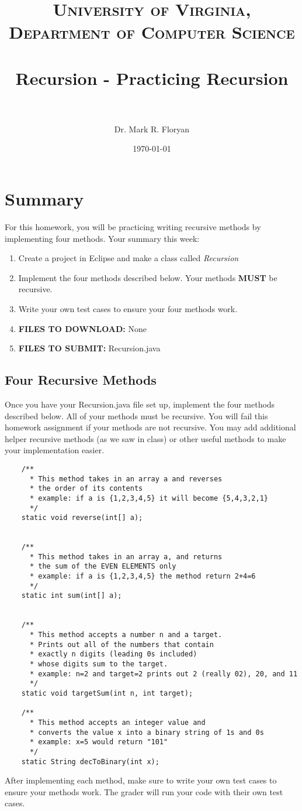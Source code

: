 \documentclass[paper=a4, fontsize=11pt, parskip=full]{scrartcl} %
\title{
\normalfont \normalsize
\textsc{University of Virginia, Department of Computer Science} \\ [25pt] %
\horrule{0.5pt} \\[0.4cm] %
\huge Recursion - Practicing Recursion \\ %
\horrule{2pt} \\[0.5cm] %
}
\author{Dr. Mark R. Floryan} %
\date{\normalsize\today} %
\numberwithin{equation}{section} %
\numberwithin{figure}{section} %
\numberwithin{table}{section} %
\begin{document}
\maketitle %


\section{Summary}

For this homework, you will be practicing writing recursive methods by implementing four methods. Your summary this week:

\begin{enumerate}
	\item Create a project in Eclipse and make a class called \emph{Recursion}
	\item Implement the four methods described below. Your methods \textbf{MUST} be recursive.
	\item Write your own test cases to ensure your four methods work.
	\item \textbf{FILES TO DOWNLOAD:} None
	\item \textbf{FILES TO SUBMIT:} Recursion.java
\end{enumerate}


\subsection{Four Recursive Methods}

Once you have your Recursion.java file set up, implement the four methods described below. All of your methods must be recursive. You will fail this homework assignment if your methods are not recursive. You may add additional helper recursive methods (as we saw in class) or other useful methods to make your implementation easier.

\begin{lstlisting}
	/**
	  * This method takes in an array a and reverses
	  * the order of its contents
	  * example: if a is {1,2,3,4,5} it will become {5,4,3,2,1}
	  */
	static void reverse(int[] a);
	

	/**
	  * This method takes in an array a, and returns
	  * the sum of the EVEN ELEMENTS only
	  * example: if a is {1,2,3,4,5} the method return 2+4=6
	  */
	static int sum(int[] a);
	

	/**
	  * This method accepts a number n and a target.
	  * Prints out all of the numbers that contain
	  * exactly n digits (leading 0s included)
	  * whose digits sum to the target.
	  * example: n=2 and target=2 prints out 2 (really 02), 20, and 11
	  */
	static void targetSum(int n, int target);

	/**
	  * This method accepts an integer value and
	  * converts the value x into a binary string of 1s and 0s
	  * example: x=5 would return "101"
	  */
	static String decToBinary(int x);
\end{lstlisting}

After implementing each method, make sure to write your own test cases to ensure your methods work. The grader will run your code with their own test cases.


\end{document}
